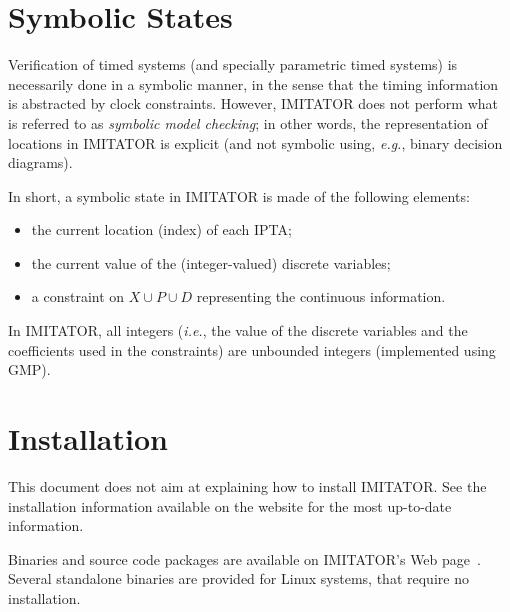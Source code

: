 \documentclass[a4paper,11pt]{report}
\makeatletter
\newcommand{\Clock}{X} %
\newcommand{\DVar}{D} %
\newcommand{\Param}{P} %
\newcommand{\imitator}{\textsf{IMITATOR}}
\newcommand{\IPTA}{IPTA}
\newcommand{\eg}{\textcolor{colorok}{\textit{e.g.},\@}}
\newcommand{\ie}{\textcolor{colorok}{\textit{i.e.},\@}}
\makeatother
\begin{document}
\section{Symbolic States}

Verification of timed systems (and specially parametric timed systems) is necessarily done in a symbolic manner, in the sense that the timing information is abstracted by clock constraints.
However, \imitator{} does not perform what is referred to as \emph{symbolic model checking}; in other words, the representation of locations in \imitator{} is explicit (and not symbolic using, \eg{} binary decision diagrams).


In short, a symbolic state in \imitator{} is made of the following elements:
\begin{itemize}
	\item the current location (index) of each \IPTA{};
	\item the current value of the (integer-valued) discrete variables;
	\item a constraint on $\Clock \cup \Param \cup \DVar$ representing the continuous information.
\end{itemize}
In \imitator{}, all integers (\ie{} the value of the discrete variables and the coefficients used in the constraints) are unbounded integers (implemented using GMP).



\section{Installation}

This document does not aim at explaining how to install \imitator{}.
See the installation information available on the website for the most up-to-date information.

Binaries and source code packages are available on \imitator{}'s Web page~\cite{imitator}.
Several standalone binaries are provided for Linux systems, that require no installation.



\end{document}
